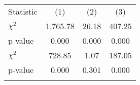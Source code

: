 \begin{center}
\begin{tabular}{lccc}
\hline \noalign{\smallskip}Statistic & (1) & (2) & (3)\\
\noalign{\smallskip}\hline \noalign{\smallskip}$\chi^2$ & 1,765.78 & 26.18 & 407.25\\
p-value & 0.000 & 0.000 & 0.000\\
$\chi^2$ & 728.85 & 1.07 & 187.05\\
p-value & 0.000 & 0.301 & 0.000\\
\noalign{\smallskip}\hline\end{tabular}\\
\end{center}
